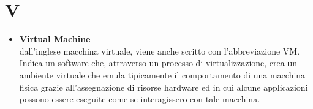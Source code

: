 \chapter{V} \label{V}
\begin{itemize}
	\item \textbf{Virtual Machine}\\
	dall'inglese macchina virtuale, viene anche scritto con l'abbreviazione VM. Indica un software che, attraverso un processo di virtualizzazione, crea un ambiente virtuale che emula tipicamente il comportamento di una macchina fisica grazie all'assegnazione di risorse hardware ed in cui alcune applicazioni possono essere eseguite come se interagissero con tale macchina.
\end{itemize}